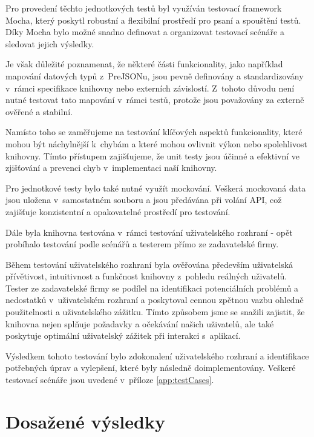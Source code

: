 \documentclass[czech, bc, kiv, he, iso690numb]{fasthesis}
\begin{document}
Pro provedení těchto jednotkových testů byl využíván testovací framework Mocha, který poskytl robustní a flexibilní prostředí pro psaní a spouštění testů. 
Díky Mocha bylo možné snadno definovat a organizovat testovací scénáře a sledovat jejich výsledky.

Je však důležité poznamenat, že některé části funkcionality, jako například mapování datových typů z~PreJSONu, jsou pevně definovány a standardizovány v~rámci specifikace knihovny nebo externích závislostí. 
Z~tohoto důvodu není nutné testovat tato mapování v~rámci testů, protože jsou považovány za externě ověřené a stabilní.

Namísto toho se zaměřujeme na testování klíčových aspektů funkcionality, které mohou být náchylnější k~chybám a které mohou ovlivnit výkon nebo spolehlivost knihovny. 
Tímto přístupem zajišťujeme, že unit testy jsou účinné a efektivní ve zjišťování a prevenci chyb v~implementaci naší knihovny.

Pro jednotkové testy bylo také nutné využít mockování. Veškerá mockovaná data jsou uložena v~samostatném souboru a jsou předávána při volání API, 
což zajišťuje konzistentní a opakovatelné prostředí pro testování.

Dále byla knihovna testována v~rámci testování uživatelského rozhraní - opět probíhalo testování podle scénářů a testerem přímo ze zadavatelské firmy.

Během testování uživatelského rozhraní byla ověřována především uživatelská přívětivost, intuitivnost a funkčnost knihovny z~pohledu reálných uživatelů. 
Tester ze zadavatelské firmy se podílel na identifikaci potenciálních problémů a nedostatků v~uživatelském rozhraní a poskytoval cennou zpětnou vazbu ohledně použitelnosti a uživatelského zážitku.
Tímto způsobem jsme se snažili zajistit, že knihovna nejen splňuje požadavky a očekávání našich uživatelů, ale také poskytuje optimální uživatelský zážitek při interakci s~aplikací.

Výsledkem tohoto testování bylo zdokonalení uživatelského rozhraní a identifikace potřebných úprav a vylepšení, které byly následně doimplementovány. Veškeré testovací scénáře
jsou uvedené v~příloze \ref{app:testCases}.

\section{Dosažené výsledky}
\end{document}
